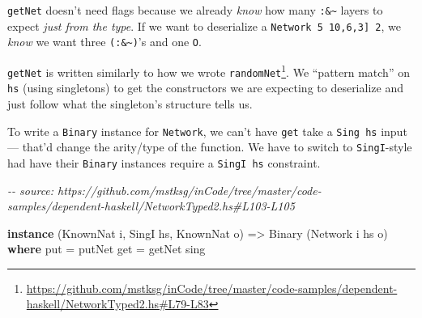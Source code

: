 \documentclass[]{article}
\newenvironment{Shaded}{}{}
\newcommand{\CommentTok}[1]{\textcolor[rgb]{0.38,0.63,0.69}{\textit{#1}}}
\newcommand{\DataTypeTok}[1]{\textcolor[rgb]{0.56,0.13,0.00}{#1}}
\newcommand{\KeywordTok}[1]{\textcolor[rgb]{0.00,0.44,0.13}{\textbf{#1}}}
\newcommand{\NormalTok}[1]{#1}
\newcommand{\OperatorTok}[1]{\textcolor[rgb]{0.40,0.40,0.40}{#1}}
\newcommand{\OtherTok}[1]{\textcolor[rgb]{0.00,0.44,0.13}{#1}}
\renewcommand{\href}[2]{#2\footnote{\url{#1}}}
\begin{document}
\begin{Shaded}
\end{Shaded}

\texttt{getNet} doesn't need flags because we already \emph{know} how many
\texttt{:\&\textasciitilde{}} layers to expect \emph{just from the type}. If we
want to deserialize a \texttt{Network\ 5\ \textquotesingle{}{[}10,6,3{]}\ 2}, we
\emph{know} we want three \texttt{(:\&\textasciitilde{})}'s and one \texttt{O}.

\texttt{getNet} is written similarly to how we wrote
\href{https://github.com/mstksg/inCode/tree/master/code-samples/dependent-haskell/NetworkTyped2.hs\#L79-L83}{\texttt{randomNet\textquotesingle{}}}.
We ``pattern match'' on \texttt{hs} (using singletons) to get the constructors
we are expecting to deserialize and just follow what the singleton's structure
tells us.

To write a \texttt{Binary} instance for \texttt{Network}, we can't have
\texttt{get} take a \texttt{Sing\ hs} input --- that'd change the arity/type of
the function. We have to switch to \texttt{SingI}-style had have their
\texttt{Binary} instances require a \texttt{SingI\ hs} constraint.

\begin{Shaded}
\begin{Highlighting}[]
\CommentTok{{-}{-} source: https://github.com/mstksg/inCode/tree/master/code{-}samples/dependent{-}haskell/NetworkTyped2.hs\#L103{-}L105}

\KeywordTok{instance}\NormalTok{ (}\DataTypeTok{KnownNat}\NormalTok{ i, }\DataTypeTok{SingI}\NormalTok{ hs, }\DataTypeTok{KnownNat}\NormalTok{ o) }\OtherTok{=\textgreater{}} \DataTypeTok{Binary}\NormalTok{ (}\DataTypeTok{Network}\NormalTok{ i hs o) }\KeywordTok{where}
\NormalTok{    put }\OtherTok{=}\NormalTok{ putNet}
\NormalTok{    get }\OtherTok{=}\NormalTok{ getNet sing}
\end{Highlighting}
\end{Shaded}
\end{document}
